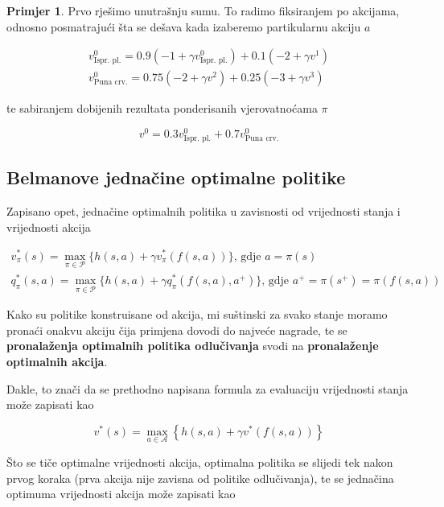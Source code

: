 \documentclass[12pt]{IEEEtran}
\numberwithin{equation}{subsection}
\numberwithin{figure}{subsection}
\theoremstyle{definition}
\newtheorem{example}{Primjer}
\numberwithin{example}{section}
\begin{document}
\begin{example}
Prvo rje\v{s}imo unutra\v{s}nju sumu. To radimo fiksiranjem po akcijama, odnosno posmatraju\'{c}i \v{s}ta se
de\v{s}ava kada izaberemo partikularnu akciju $a$

\begin{gather}
    v^{0}_{\text{Ispr. pl.}} = 0.9(-1 + \gamma v^{0}_{\text{Ispr. pl.}}) + 0.1(-2 + \gamma v^{1})\\
    v^{0}_{\text{Puna crv.}} = 0.75(-2 + \gamma v^{2}) + 0.25(-3 + \gamma v^{3})
\end{gather}

te sabiranjem dobijenih rezultata ponderisanih vjerovatno\'{c}ama $\pi$ 

\begin{equation}
    v^{0} = 0.3v^{0}_{\text{Ispr. pl.}} + 0.7v^{0}_{\text{Puna crv.}} 
\end{equation}

\end{example}

\subsection{\textbf{Belmanove jedna\v{c}ine optimalne politike}}

Zapisano opet, jedna\v{c}ine optimalnih politika u zavisnosti od vrijednosti
stanja i vrijednosti akcija

\begin{gather}
    v^{*}_{\pi}(s) = \max_{\pi \in \mathcal{P}}\{h(s, a) + \gamma v^{*}_{\pi}(f(s, a))\} \text{, gdje } a = \pi(s)\\
    q^{*}_{\pi}(s, a) = \max_{\pi \in \mathcal{P}}\{h(s, a) + \gamma q^{*}_{\pi}(f(s, a), a^{+})\} \text{, gdje } a^{+} = \pi(s^{+}) = \pi(f(s, a))
\end{gather}

Kako su politike konstruisane od akcija, mi su\v{s}tinski za svako stanje
moramo prona\'{c}i onakvu akciju \v{c}ija primjena dovodi do
najve\'{c}e nagrade, te se \textbf{pronala\v{z}enja optimalnih politika odlu\v{c}ivanja}
svodi na \textbf{pronala\v{z}enje optimalnih akcija}.

Dakle, to zna\v{c}i da se prethodno napisana formula za evaluaciju vrijednosti stanja mo\v{z}e  zapisati kao

\begin{equation}
    v^{*}(s) = \max_{a \in \mathcal{A}}\left\{ h(s, a) + \gamma v^{*}(f(s, a)) \right\}
\end{equation}

\v{S}to se ti\v{c}e optimalne vrijednosti akcija,
optimalna politika se slijedi tek nakon prvog koraka
(prva akcija nije zavisna od politike odlu\v{c}ivanja),
te se jedna\v{c}ina optimuma vrijednosti akcija mo\v{z}e
zapisati kao
\end{document}

